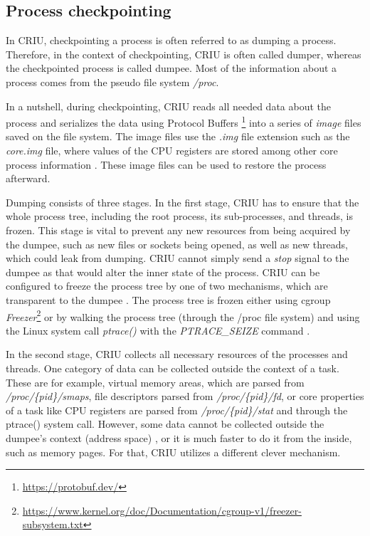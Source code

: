 \documentclass[
  digital,     %
  oneside,     %
  nosansbold,  %
  nocolorbold, %
  lof,         %
  nolot,         %
]{fithesis4}
\begin{document}
\subsection{Process checkpointing}
In CRIU, checkpointing a process is often referred to as dumping a process. Therefore, in the context of checkpointing, CRIU is often called dumper, whereas the checkpointed process is called dumpee. Most of the information about a process comes from the pseudo file system \emph{/proc}. 

In a nutshell, during checkpointing, CRIU reads all needed data about the process and serializes the data using Protocol Buffers \footnote{\url{https://protobuf.dev/}} into a series of \emph{image} files saved on the file system. The image files use the \emph{.img} file extension such as the \emph{core.img} file, where values of the CPU registers are stored among other core process information \cite{criu_images}. These image files can be used to restore the process afterward. 

Dumping consists of three stages. In the first stage, CRIU has to ensure that the whole process tree, including the root process, its sub-processes, and threads, is frozen. This stage is vital to prevent any new resources from being acquired by the dumpee, such as new files or sockets being opened, as well as new threads, which could leak from dumping. CRIU cannot simply send a \emph{stop} signal to the dumpee as that would alter the inner state of the process. CRIU can be configured to freeze the process tree by one of two mechanisms, which are transparent to the dumpee \cite{criu_freezing}. The process tree is frozen either using cgroup \emph{Freezer}\footnote{\url{https://www.kernel.org/doc/Documentation/cgroup-v1/freezer-subsystem.txt}} or by walking the process tree (through the /proc file system) and using the Linux system call \emph{ptrace()} with the \emph{PTRACE\_SEIZE} command \cite{criu_cr}.

In the second stage, CRIU collects all necessary resources of the processes and threads. One category of data can be collected outside the context of a task. These are for example, virtual memory areas, which are parsed from \emph{/proc/\{pid\}/smaps}, file descriptors parsed from \emph{/proc/\{pid\}/fd}, or core properties of a task like CPU registers are parsed from \emph{/proc/\{pid\}/stat} and through the ptrace() system call. However, some data cannot be collected outside the dumpee's context (address space) \cite{criu_cr}, or it is much faster to do it from the inside, such as memory pages. For that, CRIU utilizes a different clever mechanism.
\end{document}
